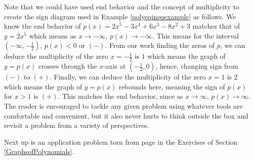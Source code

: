Note that we could have used end behavior and the concept of multiplicity to create the sign diagram used in Example \ref{polyeqineqexample} as follows.  We know the end behavior of $p(x) = 2x^5-3x^4+6x^3-8x^2+3$ matches that of $y = 2x^5$ which means as $x \rightarrow -\infty$, $p(x) \rightarrow -\infty$.  This means for the interval $\left(-\infty, -\frac{1}{2}\right)$, $p(x) < 0$ or $(-)$. From our work finding the zeros of $p$, we can deduce the multiplicity of the zero $x = -\frac{1}{2}$ is $1$ which means the graph of $y = p(x)$ crosses through the $x$-axis at $\left( -\frac{1}{2}, 0 \right)$, hence, changing sign from $(-)$ to $(+)$.  Finally, we can deduce the multiplicity of the zero $x = 1$ is $2$ which means the graph of $y = p(x)$ rebounds here, meaning the sign of $p(x)$ for $x > 1$ is $(+)$.  This matches the end behavior, since as $x \rightarrow \infty$, $p(x) \rightarrow \infty$.  The reader is encouraged to tackle any given problem using whatever tools are comfortable and convenient, but it also never hurts to think outside the box and revisit a problem from a variety of perspectives.

Next up is an application problem torn  from page \pageref{LCDmaxprofit} in the Exercises of Section \ref{GraphsofPolynomials}.


